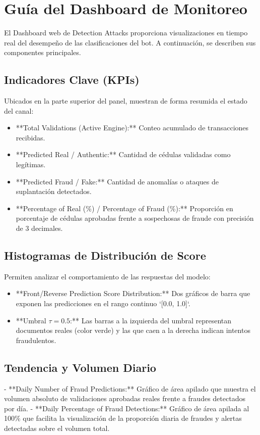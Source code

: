 \section{Guía del Dashboard de Monitoreo}
\label{sec:dashboard}

El Dashboard web de Detection Attacks proporciona visualizaciones en tiempo real del desempeño de las clasificaciones del bot. A continuación, se describen sus componentes principales.

\subsection{Indicadores Clave (KPIs)}
Ubicados en la parte superior del panel, muestran de forma resumida el estado del canal:
\begin{itemize}
    \item **Total Validations (Active Engine):** Conteo acumulado de transacciones recibidas.
    \item **Predicted Real / Authentic:** Cantidad de cédulas validadas como legítimas.
    \item **Predicted Fraud / Fake:** Cantidad de anomalías o ataques de suplantación detectados.
    \item **Percentage of Real (\%) / Percentage of Fraud (\%):** Proporción en porcentaje de cédulas aprobadas frente a sospechosas de fraude con precisión de 3 decimales.
\end{itemize}

\subsection{Histogramas de Distribución de Score}
Permiten analizar el comportamiento de las respuestas del modelo:
\begin{itemize}
    \item **Front/Reverse Prediction Score Distribution:** Dos gráficos de barra que exponen las predicciones en el rango continuo `[0.0, 1.0]`. 
    \item **Umbral $\tau = 0.5$:** Las barras a la izquierda del umbral representan documentos reales (color verde) y las que caen a la derecha indican intentos fraudulentos.
\end{itemize}

\subsection{Tendencia y Volumen Diario}
- **Daily Number of Fraud Predictions:** Gráfico de área apilado que muestra el volumen absoluto de validaciones aprobadas reales frente a fraudes detectados por día.
- **Daily Percentage of Fraud Detections:** Gráfico de área apilada al 100\% que facilita la visualización de la proporción diaria de fraudes y alertas detectadas sobre el volumen total.

